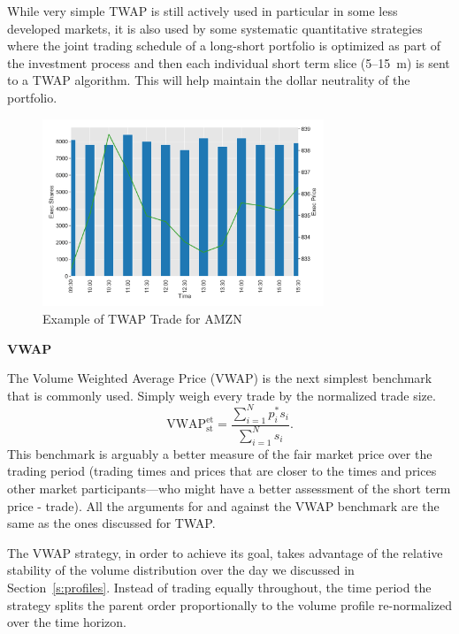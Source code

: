 While very simple TWAP is still actively used in particular in some less developed markets, it is also used by some systematic quantitative strategies where the joint trading schedule of a long-short portfolio is optimized as part of the investment process and then each individual short term slice (5--15~m) is sent to a TWAP algorithm. This will help maintain the dollar neutrality of the portfolio. \twomedskip

        \begin{figure}[!ht]
        \centering
        \includegraphics[width=0.75\textwidth]{chapters/chapter_exec_models/figures/twap.png} 
        \caption{Example of TWAP Trade for AMZN \label{fig:vwap}}
        \end{figure}


\noindent\textbf{VWAP} \twomedskip


The Volume Weighted Average Price (VWAP) is the next simplest benchmark that is commonly used. Simply weigh every trade by the normalized trade size.
        \begin{equation} \label{eq:vwapstet}
        \text{VWAP}_{\text{st}} ^{\text{et}}= \dfrac{ \sum_{i=1}^N p_i^* s_i }{ \sum_{i=1}^N s_i }.
        \end{equation}
This benchmark  is arguably a better measure of the fair market price over the trading period (trading times and prices that are closer to the times and prices other market participants---who might have a better assessment of the short term price - trade). All the arguments for and against the VWAP benchmark are the same as the ones discussed for TWAP.\twomedskip

The VWAP strategy, in order to achieve its goal, takes advantage of the relative stability of the volume distribution over the day we discussed in Section~\ref{s:profiles}. Instead of trading equally throughout, the time period the strategy splits the parent order proportionally to the volume profile re-normalized over the time horizon.

